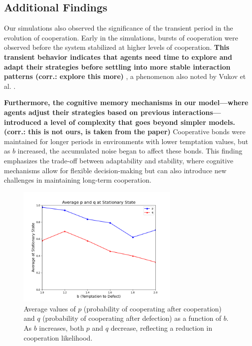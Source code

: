 \documentclass[runningheads]{llncs}
\begin{document}
\subsection{Additional Findings}
Our simulations also observed the significance of the transient period in the evolution
of cooperation. Early in the simulations, bursts of cooperation were observed
before the system stabilized at higher levels of cooperation.
\textbf{This transient behavior indicates that agents need time to explore and
adapt their strategies before settling into more stable interaction patterns
(corr.: explore this more)} , a phenomenon also noted by Vukov et al. \cite{vukov}.

\textbf{Furthermore, the cognitive memory mechanisms in our model—where agents adjust their strategies based on previous interactions—introduced a level of complexity that goes beyond simpler models. (corr.: this is not ours, is taken from the paper)}  Cooperative bonds were maintained for longer periods in environments with lower temptation values, but as \( b \) increased, the accumulated noise began to affect these bonds. This finding emphasizes the trade-off between adaptability and stability, where cognitive mechanisms allow for flexible decision-making but can also introduce new challenges in maintaining long-term cooperation.

\begin{figure}[htbp]
    \centering
    \includegraphics[width=0.7\textwidth]{p_q_vs_b.png}
    \caption{Average values of \( p \) (probability of cooperating after cooperation) and \( q \) (probability of cooperating after defection) as a function of \( b \). As \( b \) increases, both \( p \) and \( q \) decrease, reflecting a reduction in cooperation likelihood.}
    \label{fig:p_q_vs_b}
\end{figure}
\end{document}
